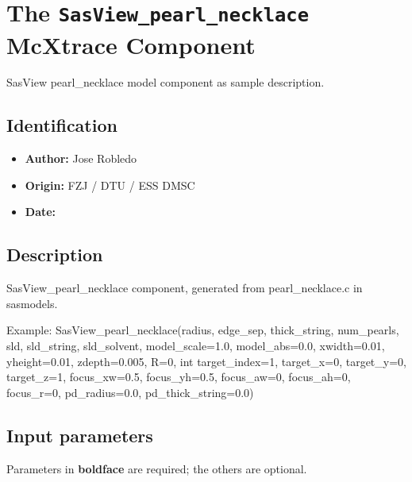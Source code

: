 \section{The \texttt{SasView\_pearl\_necklace} McXtrace Component}
SasView pearl\_necklace model component as sample description.

\subsection*{Identification}
\begin{itemize}
  \item \textbf{Author:} Jose Robledo
  \item \textbf{Origin:} FZJ / DTU / ESS DMSC
  \item \textbf{Date:} 
\end{itemize}

\subsection*{Description}
SasView\_pearl\_necklace component, generated from pearl\_necklace.c in sasmodels.

Example: SasView\_pearl\_necklace(radius, edge\_sep, thick\_string, num\_pearls, sld, sld\_string, sld\_solvent, model\_scale=1.0, model\_abs=0.0, xwidth=0.01, yheight=0.01, zdepth=0.005, R=0, int target\_index=1, target\_x=0, target\_y=0, target\_z=1, focus\_xw=0.5, focus\_yh=0.5, focus\_aw=0, focus\_ah=0, focus\_r=0, pd\_radius=0.0, pd\_thick\_string=0.0)

\subsection*{Input parameters}
Parameters in \textbf{boldface} are required; the others are optional.

